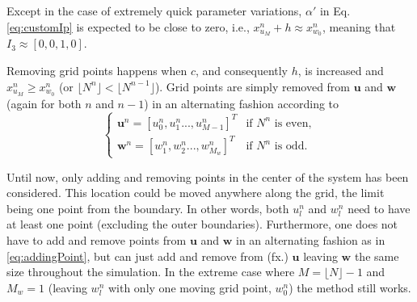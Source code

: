 Except in the case of extremely quick parameter variations, $\alpha'$ in Eq. \eqref{eq:customIp} is expected to be close to zero, i.e., $x_{u_M}^n + h \approx x_{w_0}^n$, meaning that $I_3 \approx [0, 0, 1, 0]$. %

Removing grid points happens when $c$, and consequently $h$, is increased and $x_{u_M}^n \geq x_{w_0}^n$ (or $\lfloor N^n\rfloor < \lfloor N^{n-1}\rfloor$). %
Grid points are simply removed from $\mathbf{u}$ and $\mathbf{w}$ (again for both $n$ and $n-1$) in an alternating fashion according to
\begin{equation}\label{eq:removingPoint}
\begin{cases}
    \mathbf{u}^n = [u_0^n, u_1^n ..., u_{M-1}^n]^T & \text{if $N^n$ is even}, \\
     \mathbf{w}^n = [w_1^n, w_2^n ..., w_{M_w}^n]^T & \text{if $N^n$ is odd}.
    \end{cases}
\end{equation}

Until now, only adding and removing points in the center of the system has been considered. This location could be moved anywhere along the grid, the limit being one point from the boundary. In other words, both $u_l^n$ and $w_l^n$ need to have at least one point (excluding the outer boundaries). Furthermore, one does not have to add and remove points from $\mathbf{u}$ and $\mathbf{w}$ in an alternating fashion as in \eqref{eq:addingPoint}, but can just add and remove from (fx.) $\mathbf{u}$ leaving $\mathbf{w}$ the same size throughout the simulation. In the extreme case where $M = \lfloor N\rfloor - 1$ and $M_w = 1$ (leaving $w_l^n$ with only one moving grid point, $w_0^n$) the method still works.

